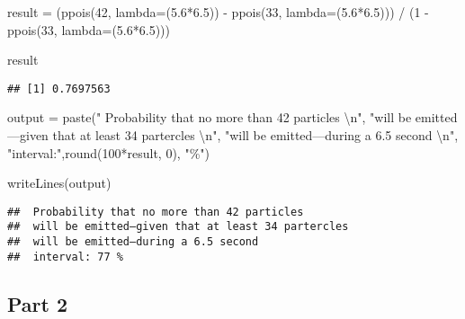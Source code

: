 \documentclass[
]{article}
\newenvironment{Shaded}{\begin{snugshade}}{\end{snugshade}}
\newcommand{\AttributeTok}[1]{\textcolor[rgb]{0.77,0.63,0.00}{#1}}
\newcommand{\DecValTok}[1]{\textcolor[rgb]{0.00,0.00,0.81}{#1}}
\newcommand{\FloatTok}[1]{\textcolor[rgb]{0.00,0.00,0.81}{#1}}
\newcommand{\FunctionTok}[1]{\textcolor[rgb]{0.00,0.00,0.00}{#1}}
\newcommand{\NormalTok}[1]{#1}
\newcommand{\OtherTok}[1]{\textcolor[rgb]{0.56,0.35,0.01}{#1}}
\newcommand{\SpecialCharTok}[1]{\textcolor[rgb]{0.00,0.00,0.00}{#1}}
\newcommand{\StringTok}[1]{\textcolor[rgb]{0.31,0.60,0.02}{#1}}
\begin{document}
\begin{Shaded}
\begin{Highlighting}[]
\NormalTok{result }\OtherTok{=}\NormalTok{ (}\FunctionTok{ppois}\NormalTok{(}\DecValTok{42}\NormalTok{, }\AttributeTok{lambda=}\NormalTok{(}\FloatTok{5.6}\SpecialCharTok{*}\FloatTok{6.5}\NormalTok{)) }\SpecialCharTok{{-}} \FunctionTok{ppois}\NormalTok{(}\DecValTok{33}\NormalTok{, }\AttributeTok{lambda=}\NormalTok{(}\FloatTok{5.6}\SpecialCharTok{*}\FloatTok{6.5}\NormalTok{))) }\SpecialCharTok{/} 
\NormalTok{         (}\DecValTok{1} \SpecialCharTok{{-}} \FunctionTok{ppois}\NormalTok{(}\DecValTok{33}\NormalTok{, }\AttributeTok{lambda=}\NormalTok{(}\FloatTok{5.6}\SpecialCharTok{*}\FloatTok{6.5}\NormalTok{)))}

\NormalTok{result}
\end{Highlighting}
\end{Shaded}

\begin{verbatim}
## [1] 0.7697563
\end{verbatim}

\begin{Shaded}
\begin{Highlighting}[]
\NormalTok{output }\OtherTok{=} \FunctionTok{paste}\NormalTok{(}\StringTok{" Probability that no more than 42 particles }\SpecialCharTok{\textbackslash{}n}\StringTok{"}\NormalTok{, }
               \StringTok{"will be emitted—given that at least 34 partercles }\SpecialCharTok{\textbackslash{}n}\StringTok{"}\NormalTok{, }
               \StringTok{"will be emitted—during a 6.5 second }\SpecialCharTok{\textbackslash{}n}\StringTok{"}\NormalTok{, }
               \StringTok{"interval:"}\NormalTok{,}\FunctionTok{round}\NormalTok{(}\DecValTok{100}\SpecialCharTok{*}\NormalTok{result, }\DecValTok{0}\NormalTok{), }\StringTok{"\%"}\NormalTok{)}

\FunctionTok{writeLines}\NormalTok{(output)}
\end{Highlighting}
\end{Shaded}

\begin{verbatim}
##  Probability that no more than 42 particles 
##  will be emitted—given that at least 34 partercles 
##  will be emitted—during a 6.5 second 
##  interval: 77 %
\end{verbatim}

\newpage

\hypertarget{part-2}{%
\subsection{Part 2}\label{part-2}}
\end{document}
